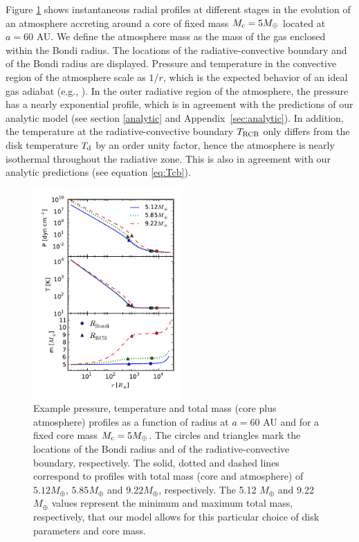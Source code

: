 \documentclass[apj]{emulateapj}
\newcommand{\App}[1]{Appendix~\ref{#1}}
\begin{document}
Figure \ref{fig:profiles} shows instantaneous radial profiles at different stages in the evolution of an atmosphere accreting around a core of fixed mass $M_{\rm{c}}=5 M_{\oplus}$ located at $a=60$ AU.  We define the atmosphere mass as the mass of the gas enclosed within the Bondi radius. The locations of the radiative-convective boundary and of the Bondi radius are displayed. Pressure and temperature in the convective region of the atmosphere scale as $1/r$, which is the expected behavior of an ideal gas adiabat (e.g., \citealt{rafikov06}). In the outer radiative region of the atmosphere, the pressure has a nearly exponential profile, which is in agreement with the predictions of our analytic model (see section \ref{analytic} and \App{sec:analytic}). In addition, the temperature at the radiative-convective boundary $T_{\rm{RCB}}$ only differs from the disk temperature $T_{\rm{d}}$ by an order unity factor, hence the atmosphere is nearly isothermal throughout the radiative zone. This is also in agreement with our analytic predictions (see equation \ref{eq:Tcb}). %

\begin{figure}[h]
\centering
\includegraphics[width=0.5\textwidth]{../../figs/ModelAtmospheres/RadSelfGravPoly/PaperFigs/PTm_profiles_v2.pdf}
\caption{Example pressure, temperature and total mass (core plus atmosphere) profiles as a function of radius at $a=60$ AU and for a fixed core mass $M_{\rm c}=5 M_{\oplus}$. The circles and triangles mark the locations of the Bondi radius and of the radiative-convective boundary, respectively. The solid, dotted and dashed lines correspond to profiles with total mass (core and atmosphere) of $5.12 M_{\oplus}$, $5.85 M_{\oplus}$ and $9.22 M_{\oplus}$, respectively. The 5.12 $M_{\oplus}$ and 9.22 $M_{\oplus}$ values represent the minimum and maximum total mass, respectively, that our model allows for this particular choice of disk parameters and core mass.}
\label{fig:profiles}
\end{figure}
\end{document}
